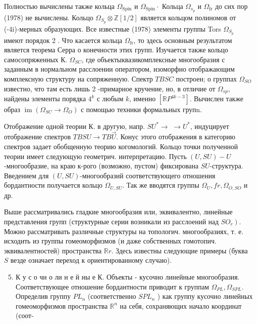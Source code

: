\documentclass[10pt]{article}
\begin{document}
Полностью вычислены также кольца $\Omega_{\operatorname{Spin}}$ и $\Omega_{\operatorname{Spin}} \cdot$ Кольца $\Omega_{s_{p}}$ и $\Omega_{\mathrm{fr}}$ до сих пор (1978) не вычислены. Кольцо $\Omega_{S_{p}} \otimes \mathbb{Z}[1 / 2]$ является кольцом полиномов от (-4i)-мерных образующих. Все известные (1978) элементы группы Tors $\Omega_{S_{p}}$ имеют порядок 2 . Что касается кольца $\Omega_{\mathrm{fr}}$, то здесь основным результатом является теорема Серра о конечности этих групп. Изучается также кольцо самосопряженных К. $\Omega_{S C}$, где объектыквазикомплексные многообразия с заданным в нормальном расслоении оператором, изоморфно отображающим комплексную структуру на сопряженную. Спектр $T B S C$ построен; о группах $\Omega_{S O}$ известно, что там есть лишь 2 -примарное кручение, но, в отличие от $\Omega_{s p}$, найдены элементы порядка $4^{k}$ с любым $k$, именно $\left[\mathbb{R} P^{4 k-3}\right]$. Вычислен также образ $\operatorname{im}\left(\Omega_{S C} \rightarrow \Omega_{O}\right)$ с помощью техники формальных групn.



Отображение одной теории К. в другую, напр. $S U^{*} \rightarrow$ $\rightarrow U^{*}$, индуцирует отображение спектров $T B S U \rightarrow T B \vec{U}$. Конус этого отображения в категорию спектров задает обобщенную теорию когомологий. Кольцо точки полученной теории имеет следующую геометрич. интерпретацию. Пусть $(U, S U)-U$-многообразие, на краю к-рого (возможно, пустом) фиксирована $S U$-структура. Введением для $(U, S U)$-многообразий соответствующего отношения бордантности получается кольцо $\Omega_{U, S U}$. Так же вводятся группы $\Omega_{U}, f r, \Omega_{O, S O}$ и др.



Выше рассматривались гладкие многообразия или, эквивалентно, линейные представления групп (структурные серии возникали из расслоений над $\left.S O_{r}\right)$. Можно рассматривать различные структуры на топологич. многообразиях, т. е. исходить из группы гомеоморфизмов (и даже собственных гомотопич. эквивалентностей) пространства $\mathbb{R} r$. Здесь известны следующие примеры (буква $S$ везде означает переход к ориентированному случаю).



\begin{enumerate}

  \setcounter{enumi}{4}

  \item К у с о чн о ли н е й ны е К. Объекты - кусочно линейные многообразия. Соответствующее отношение бордантности приводит к группам $\Omega_{P L}, \Omega_{S P L}$. Определив группу $P L_{n}$ (соответственно $S P L_{n}$ ) как группу кусочно линейных гомеоморфизмов пространства $\mathbb{R}^{n}$ на себя, сохраняющих начало координат (соот-

\end{enumerate}
\end{document}
